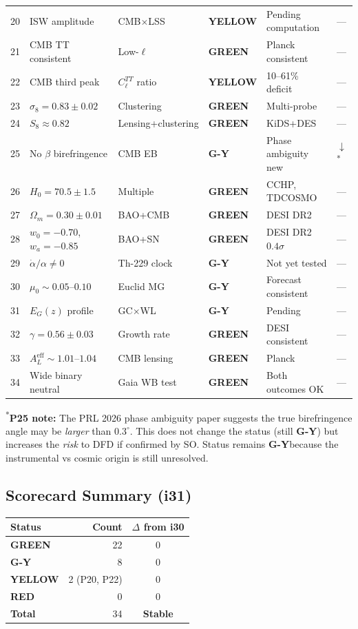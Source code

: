 \documentclass[11pt,a4paper]{article}
\newcommand{\GREEN}{\textcolor{dfdgreen}{\textbf{GREEN}}}
\newcommand{\YELLOW}{\textcolor{dfdyellow}{\textbf{YELLOW}}}
\newcommand{\RED}{\textcolor{dfdred}{\textbf{RED}}}
\newcommand{\GY}{\textcolor{dfdgy}{\textbf{G-Y}}}
\begin{document}
\begin{center}
\begin{longtable}{clp{4cm}lll}
20 & ISW amplitude & CMB$\times$LSS & \YELLOW & Pending computation & --- \\
21 & CMB TT consistent & Low-$\ell$ & \GREEN & Planck consistent & --- \\
22 & CMB third peak & $C_\ell^{TT}$ ratio & \YELLOW & 10--61\% deficit & --- \\
23 & $\sigma_8 = 0.83 \pm 0.02$ & Clustering & \GREEN & Multi-probe & --- \\
24 & $S_8 \approx 0.82$ & Lensing+clustering & \GREEN & KiDS+DES & --- \\
25 & No $\beta$ birefringence & CMB EB & \GY & Phase ambiguity new & $\downarrow$\textsuperscript{*} \\
26 & $H_0 = 70.5 \pm 1.5$ & Multiple & \GREEN & CCHP, TDCOSMO & --- \\
27 & $\Omega_m = 0.30 \pm 0.01$ & BAO+CMB & \GREEN & DESI DR2 & --- \\
28 & $w_0 = -0.70$, $w_a = -0.85$ & BAO+SN & \GREEN & DESI DR2 $0.4\sigma$ & --- \\
29 & $\dot\alpha/\alpha \neq 0$ & Th-229 clock & \GY & Not yet tested & --- \\
30 & $\mu_0 \sim 0.05$--$0.10$ & Euclid MG & \GY & Forecast consistent & --- \\
31 & $E_G(z)$ profile & GC$\times$WL & \GY & Pending & --- \\
32 & $\gamma = 0.56 \pm 0.03$ & Growth rate & \GREEN & DESI consistent & --- \\
33 & $A_L^\mathrm{eff} \sim 1.01$--$1.04$ & CMB lensing & \GREEN & Planck & --- \\
34 & Wide binary neutral & Gaia WB test & \GREEN & Both outcomes OK & --- \\
\bottomrule
\end{longtable}
\end{center}

\textsuperscript{*}\textbf{P25 note:} The PRL 2026 phase ambiguity paper suggests the true birefringence angle may be \emph{larger} than $0.3^\circ$. This does not change the status (still \GY) but increases the \emph{risk} to DFD if confirmed by SO. Status remains \GY because the instrumental vs cosmic origin is still unresolved.

\subsection{Scorecard Summary (i31)}

\begin{center}
\begin{tabular}{lrc}
\toprule
\textbf{Status} & \textbf{Count} & \textbf{$\Delta$ from i30} \\
\midrule
\GREEN & 22 & 0 \\
\GY & 8 & 0 \\
\YELLOW & 2 (P20, P22) & 0 \\
\RED & 0 & 0 \\
\midrule
\textbf{Total} & 34 & \textbf{Stable} \\
\bottomrule
\end{tabular}
\end{center}
\end{document}
